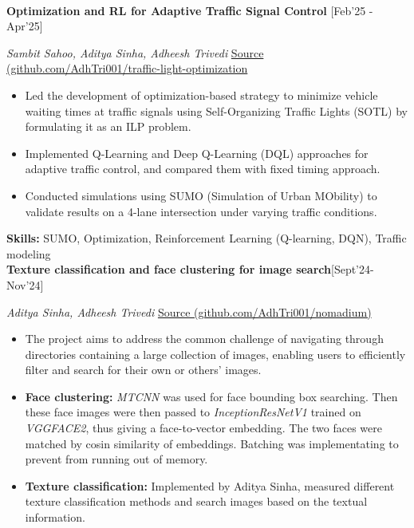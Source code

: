 
\\


\textbf{Optimization and RL for Adaptive Traffic Signal Control}
\hfill {[Feb'25 - Apr'25]}

\textit{Sambit Sahoo, Aditya Sinha, Adheesh Trivedi}
\hfill \href{https://github.com/AdhTri001/traffic-light-optimization}
    {Source (github.com/AdhTri001/traffic-light-optimization}

\begin{itemize}
    \item Led the development of optimization-based strategy to minimize vehicle waiting
    times at traffic signals using Self-Organizing Traffic Lights (SOTL) by
    formulating it as an ILP problem.
    \item Implemented Q-Learning and Deep Q-Learning (DQL) approaches
    for adaptive traffic control, and compared them with fixed timing approach.
    \item Conducted simulations using SUMO (Simulation of Urban MObility) to validate
    results on a 4-lane intersection under varying traffic conditions.
\end{itemize}

\textbf{Skills:} SUMO, Optimization, Reinforcement Learning (Q-learning, DQN), Traffic modeling
\\


\textbf{Texture classification and face clustering for image search}\hfill {[Sept'24-Nov'24]}

\textit{Aditya Sinha, Adheesh Trivedi}
    \hfill \href{https://github.com/AdhTri001/nomadium}
    {Source (github.com/AdhTri001/nomadium)}

\begin{itemize}
    \item The project aims to address the common challenge of navigating through
    directories containing a large collection of images,
    enabling users to efficiently filter and search for their own or others' images.
    \item \textbf{Face clustering:} \textit{MTCNN} was used for face bounding box searching.
    Then these face images were then passed to \textit{InceptionResNetV1} trained on
    \textit{VGGFACE2}, thus giving a face-to-vector embedding.
    The two faces were matched by cosin similarity of embeddings.
    Batching was implementating to prevent from running out of memory.
    \item \textbf{Texture classification:} Implemented by Aditya Sinha,
    measured different texture classification methods and search images
    based on the textual information.
\end{itemize}

